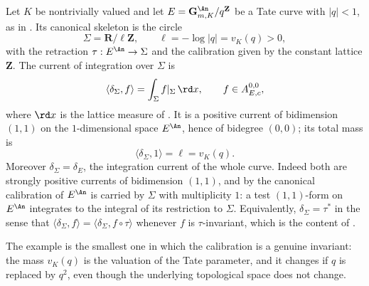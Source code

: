 \begin{example}
\label{ex:ch14-skeleton-current}
Let $K$ be nontrivially valued and let $E=\mathbf G_{m,K}^{\An}/q^{\mathbf Z}$
be a Tate curve with $|q|<1$, as in .  Its canonical
skeleton is the circle
\[
 \Sigma=\mathbf R/\ell\mathbf Z,
 \qquad \ell=-\log|q|=v_K(q)>0,
\]
with the retraction $\tau:E^{\An}\to\Sigma$ and the calibration given by the
constant lattice $\mathbf Z$.  The current of integration over $\Sigma$ is
\[
 \langle\delta_\Sigma,f\rangle=\int_\Sigma f|_\Sigma\,\rd x,
 \qquad f\in A_{E,c}^{0,0},
\]
where $\rd x$ is the lattice measure of .  It
is a positive current of bidimension $(1,1)$ on the $1$-dimensional space
$E^{\An}$, hence of bidegree $(0,0)$; its total mass is
\[
 \langle\delta_\Sigma,1\rangle=\ell=v_K(q).
\]
Moreover $\delta_\Sigma=\delta_{E}$, the integration current of the whole
curve.  Indeed both are strongly positive currents of bidimension $(1,1)$, and
by  the canonical calibration of
$E^{\An}$ is carried by $\Sigma$ with multiplicity $1$: a test $(1,1)$-form
on $E^{\An}$ integrates to the integral of its restriction to $\Sigma$.
Equivalently, $\delta_\Sigma=\tau^*$ in the sense that
$\langle\delta_\Sigma,f\rangle=\langle\delta_{\Sigma},f\circ\tau\rangle$
whenever $f$ is $\tau$-invariant, which is the content of
.

The example is the smallest one in which the calibration is a genuine
invariant: the mass $v_K(q)$ is the valuation of the Tate parameter, and it
changes if $q$ is replaced by $q^2$, even though the underlying topological
space does not change.
\end{example}
